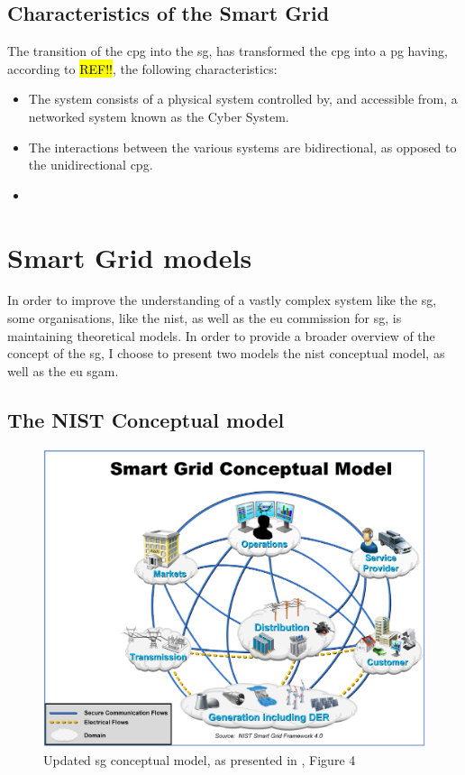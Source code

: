 \subsection{Characteristics of the Smart Grid }


The transition of the \acrshort{cpg} into the \acrshort{sg}, has transformed the \acrshort{cpg} into a \acrshort{pg} having, according to \hl{REF!!}, the following characteristics:

\begin{itemize}
    \item The system consists of a physical system controlled by, and accessible from, a networked system known as the Cyber System.
    \item The interactions between the various systems are bidirectional, as opposed to the unidirectional \acrshort{cpg}.
    \item 
\end{itemize}




\section{Smart Grid models}
In order to improve the understanding of a vastly complex system like the \acrlong{sg}, some organisations, like the \acrfull{nist}, as well as the \acrfull{eu} commission for \acrshort{sg}, is maintaining theoretical models.
In order to provide a broader overview of the concept of the \acrlong{sg}, I choose to present two models the \acrshort{nist} conceptual model, as well as the \acrshort{eu} \acrlong{sgam}.


\subsection{The NIST Conceptual model}


\begin{figure}[t]
\includegraphics[width=\linewidth]{figures/NIST-SmartGRID-ConceptualModel.png}
\caption[Smart Grid Conceptual Model]{Updated \acrlong{sg} conceptual model, as presented in \cite[p. 13]{gopstein2021nist}, Figure 4}
\label{fig:NIST-SmartGRID-ConceptualModel}
\end{figure}


